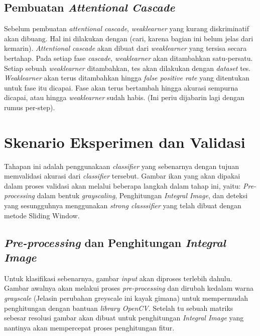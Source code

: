 \subsection{Pembuatan \emph{Attentional Cascade}}

Sebelum pembuatan \emph{attentional cascade}, \emph{weaklearner} yang kurang 
diskriminatif akan dibuang. Hal ini dilakukan dengan (cari, karena bagian ini 
belum jelas dari kemarin). \emph{Attentional cascade} akan dibuat dari \emph{weaklearner} 
yang tersisa secara bertahap. Pada setiap fase \emph{cascade}, \emph{weaklearner} akan 
ditambahkan satu-persatu. Setiap sebuah \emph{weaklearner} ditambahkan, tes akan dilakukan 
dengan \emph{dataset} tes. \emph{Weaklearner} akan terus ditambahkan hingga \emph{false positive rate} 
yang ditentukan untuk fase itu dicapai. Fase akan terus bertambah hingga 
akurasi sempurna dicapai, atau hingga \emph{weaklearner} sudah habis. (Ini periu 
dijabarin lagi dengan rumus per-step).

\section{Skenario Eksperimen dan Validasi}

Tahapan ini adalah penggunakaan \emph{classifier} yang sebenarnya dengan tujuan 
memvalidasi akurasi dari \emph{classifier} tersebut. 
Gambar ikan yang akan dipakai dalam proses validasi akan 
melalui beberapa langkah dalam tahap ini, 
yaitu: \textit{Pre-processing} dalam bentuk \emph{grayscaling}, Penghitungan 
\emph{Integral Image}, dan deteksi yang sesungguhnya menggunakan \emph{strong classsifier} 
yang telah dibuat dengan metode Sliding Window.

\subsection{\textit{Pre-processing} dan Penghitungan \emph{Integral Image}}

Untuk klasifikasi sebenarnya, gambar \emph{input} akan diproses terlebih dahulu. 
Gambar awalnya akan melakui proses \textit{pre-processing} dan dirubah kedalam warna 
\emph{grayscale} (Jelasin perubahan greyscale ini kayak gimana) 
untuk mempermudah penghitungan dengan bantuan \emph{library OpenCV}. 
Setelah tu sebuah matriks sebesar resolusi gambar akan dibuat untuk 
penghitungan \emph{Integral Image} yang nantinya akan mempercepat proses 
penghitungan fitur.

